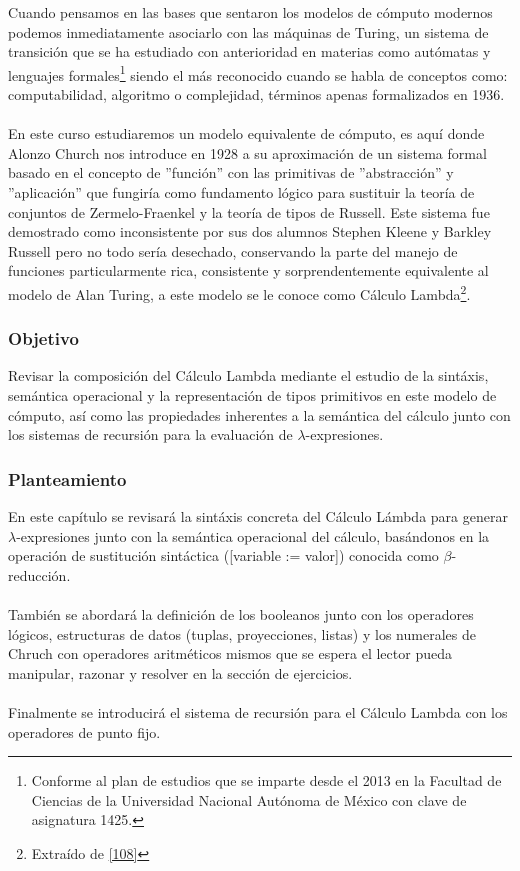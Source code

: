 Cuando pensamos en las bases que sentaron los modelos de cómputo modernos podemos inmediatamente asociarlo con las máquinas de Turing, un sistema de transición que se ha estudiado con anterioridad en materias como autómatas y lenguajes formales\footnote{Conforme al plan de estudios que se imparte desde el 2013 en la Facultad de Ciencias de la Universidad Nacional Autónoma de México con clave de asignatura 1425. } siendo el más reconocido cuando se habla de conceptos como: computabilidad, algoritmo o complejidad, términos apenas formalizados en 1936.\\\\
En este curso estudiaremos un modelo equivalente de cómputo, es aquí donde Alonzo Church nos introduce en 1928 a su aproximación de un sistema formal basado en el concepto de ''función'' con las primitivas de ''abstracción'' y ''aplicación'' que fungiría como fundamento lógico para sustituir la teoría de conjuntos de Zermelo-Fraenkel y la teoría de tipos de Russell. Este sistema fue demostrado como inconsistente por sus dos alumnos Stephen Kleene y Barkley Russell pero no todo sería desechado, conservando la parte del manejo de funciones particularmente rica, consistente y sorprendentemente equivalente al modelo de Alan Turing, a este modelo se le conoce como Cálculo Lambda\footnote{Extraído de  \hyperlink{108}{[108]}}.\\


\subsubsection{Objetivo}
Revisar la composición del Cálculo Lambda mediante el estudio de la sintáxis, semántica operacional y la representación de tipos primitivos en este modelo de cómputo, así como las propiedades inherentes a la semántica del cálculo junto con los sistemas de recursión para la evaluación de $\lambda$-expresiones. \\ 

\subsubsection{Planteamiento}
En este capítulo se revisará la sintáxis concreta del Cálculo Lámbda para generar $\lambda$-expresiones junto con
la semántica operacional del cálculo, basándonos en la operación de sustitución sintáctica ([variable := valor]) conocida como $\beta$-reducción.\\\\
También se abordará la definición de los booleanos junto con los operadores lógicos, estructuras de datos (tuplas, proyecciones, listas) y los numerales de Chruch con operadores aritméticos mismos que se espera el lector pueda manipular, razonar y resolver en la sección de ejercicios. \\\\
Finalmente se introducirá el sistema de recursión para el Cálculo Lambda con los operadores de punto fijo.


